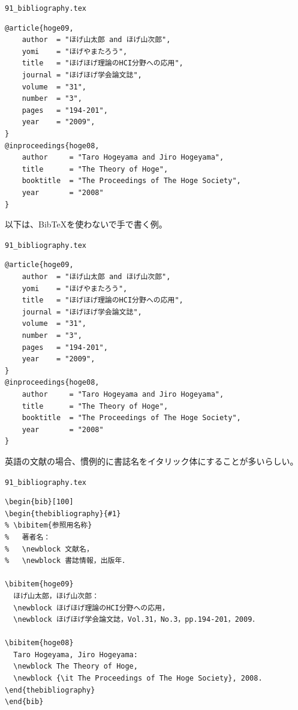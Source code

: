\begin{itembox}[l]{{\tt 91\_bibliography.tex}}
\begin{verbatim}
@article{hoge09,
    author  = "ほげ山太郎 and ほげ山次郎",
    yomi    = "ほげやまたろう",
    title   = "ほげほげ理論のHCI分野への応用",
    journal = "ほげほげ学会論文誌",
    volume  = "31",
    number  = "3",
    pages   = "194-201",
    year    = "2009",
}
@inproceedings{hoge08,
    author     = "Taro Hogeyama and Jiro Hogeyama",
    title      = "The Theory of Hoge",
    booktitle  = "The Proceedings of The Hoge Society",
    year       = "2008"
}
\end{verbatim}
\end{itembox}


以下は、BibTeXを使わないで手で書く例。

\begin{itembox}[l]{{\tt 91\_bibliography.tex}}
\begin{verbatim}
@article{hoge09,
    author  = "ほげ山太郎 and ほげ山次郎",
    yomi    = "ほげやまたろう",
    title   = "ほげほげ理論のHCI分野への応用",
    journal = "ほげほげ学会論文誌",
    volume  = "31",
    number  = "3",
    pages   = "194-201",
    year    = "2009",
}
@inproceedings{hoge08,
    author     = "Taro Hogeyama and Jiro Hogeyama",
    title      = "The Theory of Hoge",
    booktitle  = "The Proceedings of The Hoge Society",
    year       = "2008"
}
\end{verbatim}
\end{itembox}


英語の文献の場合、慣例的に書誌名をイタリック体にすることが多いらしい。

\begin{itembox}[l]{{\tt 91\_bibliography.tex}}
\begin{verbatim}
\begin{bib}[100]
\begin{thebibliography}{#1}
% \bibitem{参照用名称}
%   著者名： 
%   \newblock 文献名，
%   \newblock 書誌情報，出版年．

\bibitem{hoge09}
  ほげ山太郎，ほげ山次郎：
  \newblock ほげほげ理論のHCI分野への応用，
  \newblock ほげほげ学会論文誌，Vol.31，No.3，pp.194-201，2009．

\bibitem{hoge08}
  Taro Hogeyama, Jiro Hogeyama:
  \newblock The Theory of Hoge,
  \newblock {\it The Proceedings of The Hoge Society}, 2008.
\end{thebibliography}
\end{bib}
\end{verbatim}
\end{itembox}

